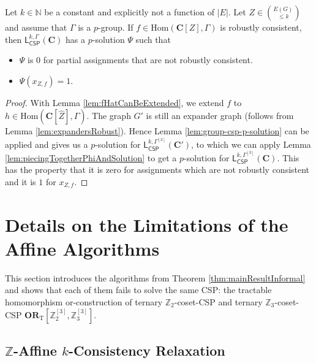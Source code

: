 \documentclass[a4paper,english, thm-restate]{lipics-v2021}
\newcommand{\ZZ}{\mathbb{Z}}
\newcommand{\StructC}{\mathbf{C}}
\newcommand{\Hom}[2]{\mathrm{Hom}(#1,#2)}
\newcommand{\leqs}{\mathsf{L}}
\newcommand{\cspiso}[3]{\leqs^{#1,#2}_{\mathsf{CSP}}(#3)}
\newcommand{\bbN}{\mathbb{N}}
\newcommand{\CosetGrpTmplt}[2]{#1^{[#2]}}
\newcommand{\ORT}[1]{\mathbf{OR}_\text{T}[#1]}
\begin{document}
	\begin{corollary}
		\label{cor:group-csp-p-solution-with-fixed-assignment}
		Let $k \in \bbN$ be a constant and explicitly not a function of $|E|$.
		Let $Z \in \binom{E(G)}{\leq k}$ and assume that $\Gamma$ is a $p$-group.
		If $f \in \Hom{\StructC[Z]}{\Gamma}$ is robustly consistent, then $\cspiso{k}{\Gamma}{\StructC}$ has a $p$-solution $\Psi$ such that
		\begin{itemize}
			\item $\Psi$ is $0$ for partial assignments that are not robustly consistent.
			\item $\Psi(x_{Z,f}) = 1$.
		\end{itemize}
	\end{corollary}
	\begin{proof}
		With Lemma \ref{lem:fHatCanBeExtended}, we extend $f$ to $h \in \Hom{\StructC[\hat{Z}]}{\Gamma}$.
		The graph $G'$ is still an expander graph (follows from Lemma \ref{lem:expandersRobust}). Hence
		Lemma \ref{lem:group-csp-p-solution} can be applied and gives us a $p$-solution for $\cspiso{k}{\CosetGrpTmplt{\Gamma}{3}}{\StructC'}$, to which we can apply Lemma \ref{lem:piecingTogetherPhiAndSolution} to get a $p$-solution for $\cspiso{k}{\CosetGrpTmplt{\Gamma}{3}}{\StructC}$.
		This has the property that it is zero for assignments which are not robustly consistent and it is $1$ for $x_{Z,f}$.
	\end{proof}	
	
	
	
	
	
	
	
	
	\section{Details on the Limitations of the Affine Algorithms}
	\label{app:power-of-affine}
	
	This section introduces the algorithms from Theorem \ref{thm:mainResultInformal}
	and shows that each of them fails to solve the same CSP:
	the tractable homomorphism or-construction
	of ternary $\ZZ_2$-coset-CSP and  ternary $\ZZ_3$-coset-CSP
	$\ORT{\CosetGrpTmplt{\ZZ_2}{3}, \CosetGrpTmplt{\ZZ_3}{3}}$.
	
	
	\subsection{\texorpdfstring{$\ZZ$}{ℤ}-Affine \texorpdfstring{$k$}{k}-Consistency Relaxation}
	\label{app:zAffineConsistency}
	
\end{document}
